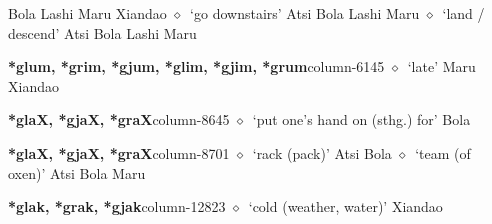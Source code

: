 \hspace{1ex}
         Bola 
\hspace{1ex}
         Lashi 
\hspace{1ex}
         Maru 
\hspace{1ex}
         Xiandao 
\hspace{1ex}
         $\diamond$~`go downstairs'
         Atsi 
\hspace{1ex}
         Bola 
\hspace{1ex}
         Lashi 
\hspace{1ex}
         Maru 
\hspace{1ex}
         $\diamond$~`land / descend'
         Atsi 
\hspace{1ex}
         Bola 
\hspace{1ex}
         Lashi 
\hspace{1ex}
         Maru 
  \item {\footnotesize \textbf{*glum, *grim, *gjum, *glim, *gjim, *grum}}{\tiny column-6145}
         $\diamond$~`late'
         Maru 
\hspace{1ex}
         Xiandao 
  \item {\footnotesize \textbf{*glaX, *gjaX, *graX}}{\tiny column-8645}
         $\diamond$~`put one's hand on (sthg.) for'
         Bola 
  \item {\footnotesize \textbf{*glaX, *gjaX, *graX}}{\tiny column-8701}
         $\diamond$~`rack (pack)'
         Atsi 
\hspace{1ex}
         Bola 
\hspace{1ex}
         $\diamond$~`team (of oxen)'
         Atsi 
\hspace{1ex}
         Bola 
\hspace{1ex}
         Maru 
  \item {\footnotesize \textbf{*glak, *grak, *gjak}}{\tiny column-12823}
         $\diamond$~`cold (weather, water)'
         Xiandao 
